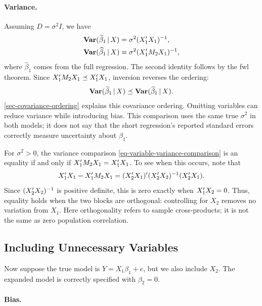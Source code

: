 \documentclass[a4paper,12pt]{article}
\begin{document}
\paragraph{Variance.}

Assuming $D=\sigma^2 I$, we have
\begin{align}
	\operatorname{\text{\textrm{\upshape\textbf{Var}}}}(\widetilde\beta_1\mathpunct{}|\mathpunct{} X)&=\sigma^2(X_1^{\prime} X_1)^{-1},\\
	\operatorname{\text{\textrm{\upshape\textbf{Var}}}}(\widehat\beta_1\mathpunct{}|\mathpunct{} X)&=\sigma^2(X_1^{\prime} M_2X_1)^{-1},
\end{align}
where $\widehat\beta_1$ comes from the full regression.
The second identity follows by the \gls{fwl} theorem.
Since $X_1^{\prime} M_2X_1\preceq X_1^{\prime} X_1$, inversion reverses the ordering:
\begin{align}\label{eq-variable-variance-comparison}
	\operatorname{\text{\textrm{\upshape\textbf{Var}}}}(\widetilde\beta_1\mathpunct{}|\mathpunct{} X)
	\preceq\operatorname{\text{\textrm{\upshape\textbf{Var}}}}(\widehat\beta_1\mathpunct{}|\mathpunct{} X).
\end{align}
\autoref{sec-covariance-ordering} explains this covariance ordering.
Omitting variables can reduce variance while introducing bias.
This comparison uses the same true $\sigma^2$ in both models;
it does not say that the short regression's reported standard errors correctly measure uncertainty about $\beta_1$.

\begin{remark}
	For $\sigma^2>0$, the variance comparison \eqref{eq-variable-variance-comparison} is an equality if and only if $X_1^{\prime} M_2X_1=X_1^{\prime} X_1$.
	To see when this occurs, note that
	\begin{align*}
		X_1^{\prime} X_1-X_1^{\prime} M_2X_1
		=(X_2^{\prime} X_1)^{\prime}(X_2^{\prime} X_2)^{-1}(X_2^{\prime} X_1).
	\end{align*}
	Since $(X_2^{\prime} X_2)^{-1}$ is positive definite, this is zero exactly when $X_1^{\prime} X_2=0$.
	Thus, equality holds when the two blocks are orthogonal:
	controlling for $X_2$ removes no variation from $X_1$.
	Here orthogonality refers to sample cross-products; it is not the same as zero population correlation.
\end{remark}

\subsection{Including Unnecessary Variables}

Now suppose the true model is $Y=X_1\beta_1+e$, but we also include $X_2$.
The expanded model is correctly specified with $\beta_2=0$.

\paragraph{Bias.}
\end{document}
